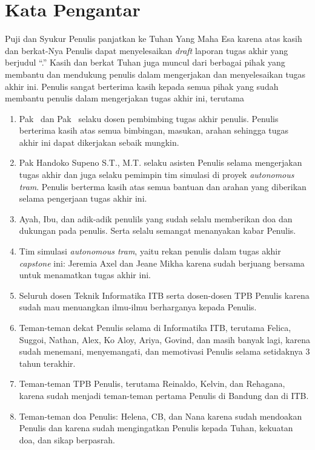 \chapter*{Kata Pengantar}

Puji dan Syukur Penulis panjatkan ke Tuhan Yang Maha Esa karena atas kasih dan
berkat-Nya Penulis dapat menyelesaikan \textit{draft} laporan tugas akhir yang
berjudul ``\thetitle.'' Kasih dan berkat Tuhan juga muncul dari berbagai pihak
yang membantu dan mendukung penulis dalam mengerjakan dan menyelesaikan tugas
akhir ini. Penulis sangat berterima kasih kepada semua pihak yang sudah membantu
penulis dalam mengerjakan tugas akhir ini, terutama

\begin{enumerate}
	\item Pak \pembimbingSatu\ dan Pak \pembimbingDua\ selaku dosen pembimbing
	      tugas akhir penulis. Penulis berterima kasih atas semua bimbingan, masukan,
	      arahan sehingga tugas akhir ini dapat dikerjakan sebaik mungkin.
	\item Pak Handoko Supeno S.T., M.T. selaku asisten Penulis selama
	      mengerjakan tugas akhir dan juga selaku pemimpin tim simulasi di proyek
	      \textit{autonomous tram}. Penulis berterma kasih atas semua bantuan dan
	      arahan yang diberikan selama pengerjaan tugas akhir ini.
	\item Ayah, Ibu, dan adik-adik penulils yang sudah selalu memberikan doa dan
	      dukungan pada penulis. Serta selalu semangat menanyakan kabar Penulis.
	\item Tim simulasi \textit{autonomous tram}, yaitu rekan penulis dalam tugas
	      akhir \textit{capstone} ini: Jeremia Axel dan Jeane Mikha karena sudah
	      berjuang bersama untuk menamatkan tugas akhir ini.
	\item Seluruh dosen Teknik Informatika ITB serta dosen-dosen TPB Penulis
	      karena sudah mau menuangkan ilmu-ilmu berharganya kepada Penulis.
	\item Teman-teman dekat Penulis selama di Informatika ITB, terutama Felica,
	      Suggoi, Nathan, Alex, Ko Aloy, Ariya, Govind, dan masih banyak lagi, karena
	      sudah menemani, menyemangati, dan memotivasi Penulis selama setidaknya 3
	      tahun terakhir.
	\item Teman-teman TPB Penulis, terutama Reinaldo, Kelvin, dan Rehagana,
	      karena sudah menjadi teman-teman pertama Penulis di Bandung dan di ITB.
	\item Teman-teman doa Penulis: Helena, CB, dan Nana karena sudah mendoakan
	      Penulis dan karena sudah mengingatkan Penulis kepada Tuhan, kekuatan
	      doa, dan sikap berpasrah.
\end{enumerate}
